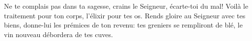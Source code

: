 Ne te complais pas dans ta sagesse,
	crains le Seigneur, écarte-toi du mal!
	Voilà le traitement pour ton corps, l’élixir pour tes os.
Rends gloire au Seigneur avec tes biens,
	donne-lui les prémices de ton revenu:
	tes greniers se rempliront de blé,
	le vin nouveau débordera de tes cuves.
